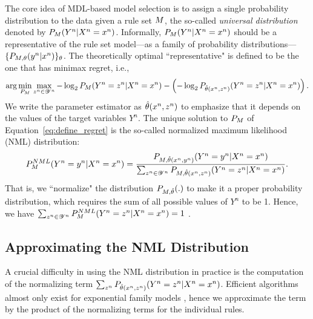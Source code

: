 The core idea of MDL-based model selection is to assign a single probability distribution to the data given a rule set $M$, the so-called \emph{universal distribution} denoted by $P_{M}(Y^n|X^n=x^n)$. Informally, $P_{M}(Y^n|X^n=x^n)$ should be a representative of the rule set model---as a family of probability distributions---$\{P_{M, \theta}(y^n | x^n)\}_\theta$. The theoretically optimal ``representative" is defined to be the one that has minimax regret, i.e., 
\small{
\begin{equation}
\label{eq:define_regret}
	  \arg \min_{P_{M}} \max_{z^n \in \mathscr{Y}^n} -\log_2 P_{M} (Y^n = z^n|X^n = x^n) - \left(-\log_2 P_{\hat{\theta}(x^n, z^n)} (Y^n = z^n|X^n = x^n)\right).
\end{equation}
}
We write the parameter estimator as $\hat{\theta}(x^n, z^n)$ to emphasize that it depends on the values of the target variables $Y^n$. The unique solution to $P_{M}$ of Equation~\ref{eq:define_regret} is the so-called normalized maximum likelihood (NML) distribution:
\begin{equation}
    P^{NML}_{M}(Y^n=y^n|X^n=x^n) = \frac{P_{M, \hat{\theta}(x^n, y^n)}(Y^n=y^n|X^n=x^n)}{\sum_{z^n \in \mathscr{Y}^n} P_{M, \hat{\theta}(x^n, z^n)}(Y^n = z^n|X^n=x^n)}.
\end{equation}
That is, we ``normalize" the distribution $P_{M, \hat{\theta}}(.)$ to make it a proper probability distribution, which requires the sum of all possible values of $Y^n$ to be 1. Hence, we have $\sum_{z^n \in \mathscr{Y}^n} P^{NML}_{M}(Y^n=z^n|X^n=x^n) = 1$ \citep{grunwald2019minimum}.

\subsection{Approximating the NML Distribution}

A crucial difficulty in using the NML distribution in practice is the computation of the normalizing term $\sum_{z^n} P_{\hat{\theta}(x^n, z^n)}(Y^n=z^n|X^n=x^n)$. Efficient algorithms almost only exist for exponential family models \citep{grunwald2019minimum}, hence we approximate the term by the product of the normalizing terms for the individual rules. 


